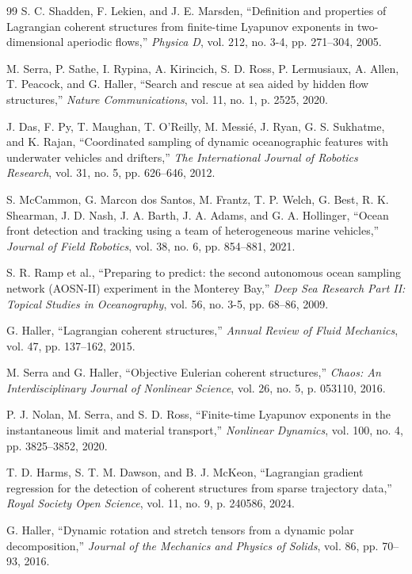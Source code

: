 \documentclass[lettersize,journal]{IEEEtran}
\begin{document}
\begin{thebibliography}{99}
 S. C. Shadden, F. Lekien, and J. E. Marsden, ``Definition and
properties of Lagrangian coherent structures from finite-time Lyapunov
exponents in two-dimensional aperiodic flows,'' \textit{Physica D}, vol. 212,
no. 3-4, pp. 271--304, 2005.

 M. Serra, P. Sathe, I. Rypina, A. Kirincich, S. D. Ross,
P. Lermusiaux, A. Allen, T. Peacock, and G. Haller, ``Search and rescue
at sea aided by hidden flow structures,'' \textit{Nature Communications},
vol. 11, no. 1, p. 2525, 2020.

 J. Das, F. Py, T. Maughan, T. O'Reilly, M. Messié, J. Ryan,
G. S. Sukhatme, and K. Rajan, ``Coordinated sampling of dynamic oceanographic
features with underwater vehicles and drifters,'' \textit{The International
Journal of Robotics Research}, vol. 31, no. 5, pp. 626--646, 2012.

 S. McCammon, G. Marcon dos Santos, M. Frantz, T. P. Welch,
G. Best, R. K. Shearman, J. D. Nash, J. A. Barth, J. A. Adams, and
G. A. Hollinger, ``Ocean front detection and tracking using a
team of heterogeneous marine vehicles,'' \textit{Journal of Field Robotics},
vol. 38, no. 6, pp. 854--881, 2021.

 S. R. Ramp et al., ``Preparing to predict: the second autonomous
ocean sampling network (AOSN-II) experiment in the Monterey Bay,''
\textit{Deep Sea Research Part II: Topical Studies in Oceanography}, vol. 56,
no. 3-5, pp. 68--86, 2009.

 G. Haller, ``Lagrangian coherent structures,'' \textit{Annual
Review of Fluid Mechanics}, vol. 47, pp. 137--162, 2015.

 M. Serra and G. Haller, ``Objective Eulerian coherent
structures,'' \textit{Chaos: An Interdisciplinary Journal of Nonlinear
Science}, vol. 26, no. 5, p. 053110, 2016.

 P. J. Nolan, M. Serra, and S. D. Ross, ``Finite-time Lyapunov
exponents in the instantaneous limit and material transport,''
\textit{Nonlinear Dynamics}, vol. 100, no. 4, pp. 3825--3852, 2020.

 T. D. Harms, S. T. M. Dawson, and B. J. McKeon, ``Lagrangian
gradient regression for the detection of coherent structures from sparse
trajectory data,'' \textit{Royal Society Open Science}, vol. 11, no. 9,
p. 240586, 2024.

 G. Haller, ``Dynamic rotation and stretch tensors from a
dynamic polar decomposition,'' \textit{Journal of the Mechanics and Physics
of Solids}, vol. 86, pp. 70--93, 2016.


\end{thebibliography}
\end{document}
